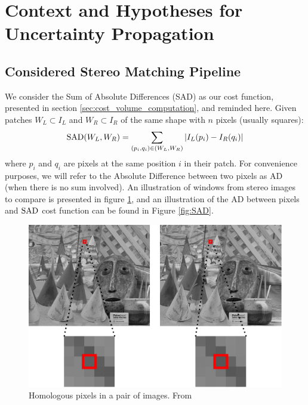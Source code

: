 \section{Context and Hypotheses for Uncertainty Propagation }\label{sec:sources_of_uncertainty}
\subsection{Considered Stereo Matching Pipeline}
We consider the Sum of Absolute Differences (SAD) as our cost function, presented in section \ref{sec:cost_volume_computation}, and reminded here. Given patches $W_L\subset I_L$ and $W_R\subset I_R$ of the same shape with $n$ pixels (usually squares):
\begin{align}
    {\mathrm{SAD}}(W_L, W_R) = \sum_{(p_i, q_i)\in (W_L, W_R)}|I_L(p_i) - I_R(q_i)|\label{eq:SAD}
\end{align}
where $p_i$ and $q_i$ are pixels at the same position $i$ in their patch. For convenience purposes, we will refer to the Absolute Difference between two pixels as AD (when there is no sum involved). An illustration of windows from stereo images to compare is presented in figure \ref{fig:Cones}, and an illustration of the AD between pixels and ${\mathrm{SAD}}$ cost function can be found in Figure \ref{fig:SAD}.

\begin{figure}[ht]
  \centering
  \includegraphics[width=0.8\linewidth]{Images/Chap_4/Cones.png}
  \caption{Homologous pixels in a pair of images. From \cite{malinowski_uncertainty_2024}}\label{fig:Cones}
\end{figure}

